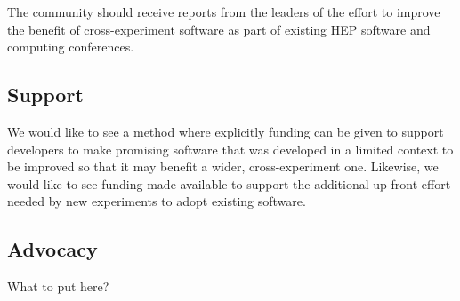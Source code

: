 The community should receive reports from the leaders of the effort to
improve the benefit of cross-experiment software as part of existing
HEP software and computing conferences.


\subsection{Support}

We would like to see a method where explicitly funding can be given to
support developers to make promising software that was developed in a
limited context to be improved so that it may benefit a wider,
cross-experiment one.  Likewise, we would like to see funding made
available to support the additional up-front effort needed by new
experiments to adopt existing software.

\subsection{Advocacy}

What to put here?

